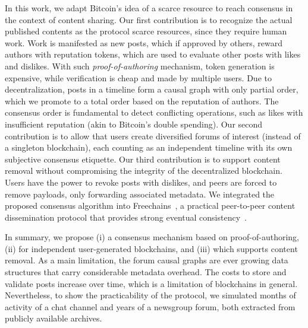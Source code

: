 \documentclass[12pt]{article}
\newcommand{\FC}       {Freechains\xspace}
\newcommand{\reps}     {\emph{reps}\xspace}
\begin{document}
In this work, we adapt Bitcoin's idea of a scarce resource to reach consensus
in the context of content sharing.
%
Our first contribution is to recognize the actual published contents as the
protocol scarce resources, since they require human work.
%
Work is manifested as new posts, which if approved by others, reward authors
with reputation tokens, which are used to evaluate other posts with likes and
dislikes.
With such \emph{proof-of-authoring} mechanism, token generation is expensive,
while verification is cheap and made by multiple users.
%
Due to decentralization, posts in a timeline form a causal graph with only
partial order, which we promote to a total order based on the reputation of
authors.
The consensus order is fundamental to detect conflicting operations, such as
likes with insufficient reputation (akin to Bitcoin's double spending).
%
Our second contribution is to allow that users create diversified forums of
interest (instead of a singleton blockchain), each counting as an independent
timeline with its own subjective consensus etiquette.
%
Our third contribution is to support content removal without compromising the
integrity of the decentralized blockchain.
Users have the power to revoke posts with dislikes, and peers are forced to
remove payloads, only forwarding associated metadata.
%
We integrated the proposed consensus algorithm into \FC~\cite{fcs.sbseg20}, a
practical peer-to-peer content dissemination protocol that provides strong
eventual consistency~\cite{p2p.crdts,p2p.sec}.

In summary, we propose
    (i)   a consensus mechanism based on proof-of-authoring,
    (ii)  for independent user-generated blockchains, and
    (iii) which supports content removal.
%
As a main limitation, the forum causal graphs are ever growing data structures
that carry considerable metadata overhead.
The costs to store and validate posts increase over time, which is a limitation
of blockchains in general.
%
Nevertheless, to show the practicability of the protocol, we simulated months
of activity of a chat channel and years of a newsgroup forum, both extracted
from publicly available archives.
\end{document}
